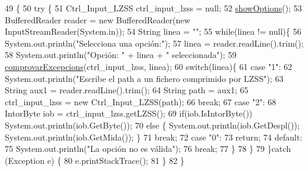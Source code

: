 \begin{DoxyCode}
49                                            \{
50     \textcolor{keywordflow}{try} \{
51         Ctrl\_Input\_LZSS ctrl\_input\_lzss = null;
52         \hyperlink{classpersistencia_1_1input_1_1Driver____Ctrl__Input__LZSS_a8221302c3603529654a83e02b976c662}{showOptions}();
53         BufferedReader reader = \textcolor{keyword}{new} BufferedReader(\textcolor{keyword}{new} InputStreamReader(System.in));
54         String linea = \textcolor{stringliteral}{""};
55         \textcolor{keywordflow}{while}(linea != null)\{
56             System.out.println(\textcolor{stringliteral}{"Selecciona una opción:"});
57             linea = reader.readLine().trim();
58             System.out.println(\textcolor{stringliteral}{"Opción: "} + linea + \textcolor{stringliteral}{" seleccionada"});
59             \hyperlink{classpersistencia_1_1input_1_1Driver____Ctrl__Input__LZSS_a221f978664fc97bdab3b18d3c5f55155}{comprovarExcepcions}(ctrl\_input\_lzss, linea);
60             \textcolor{keywordflow}{switch}(linea)\{
61                 \textcolor{keywordflow}{case} \textcolor{stringliteral}{"1"}:
62                     System.out.println(\textcolor{stringliteral}{"Escribe el path a un fichero comprimido por LZSS"});
63                     String aux1 = reader.readLine().trim();
64                     String path = aux1;
65                     ctrl\_input\_lzss = \textcolor{keyword}{new} Ctrl\_Input\_LZSS(path);
66                 \textcolor{keywordflow}{break};
67                 \textcolor{keywordflow}{case} \textcolor{stringliteral}{"2"}:
68                     IntorByte iob =  ctrl\_input\_lzss.getLZSS();
69                     \textcolor{keywordflow}{if}(iob.IsIntorByte()) System.out.println(iob.GetByte());
70                     \textcolor{keywordflow}{else} \{ System.out.println(iob.GetDespl()); System.out.println(iob.GetMida()); \}
71                 \textcolor{keywordflow}{break};
72                 \textcolor{keywordflow}{case} \textcolor{stringliteral}{"0"}:
73                     \textcolor{keywordflow}{return};
74                 \textcolor{keywordflow}{default}:
75                     System.out.println(\textcolor{stringliteral}{"La opción no es válida"});
76                 \textcolor{keywordflow}{break};
77             \}
78         \}
79     \}\textcolor{keywordflow}{catch} (Exception e) \{
80         e.printStackTrace();
81     \}
82     \}
\end{DoxyCode}
\mbox{\label{classpersistencia_1_1input_1_1Driver____Ctrl__Input__LZSS_a8221302c3603529654a83e02b976c662}} 
